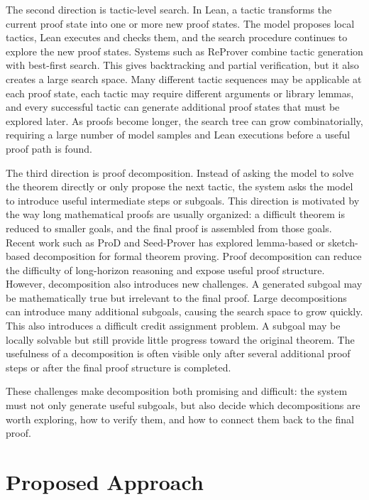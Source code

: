 The second direction is tactic-level search. In Lean, a tactic transforms the current proof state into one or more new proof states. The model proposes local tactics, Lean executes and checks them, and the search procedure continues to explore the new proof states. Systems such as ReProver \cite{yang2023leandojo} combine tactic generation with best-first search. This gives backtracking and partial verification, but it also creates a large search space. Many different tactic sequences may be applicable at each proof state, each tactic may require different arguments or library lemmas, and every successful tactic can generate additional proof states that must be explored later. As proofs become longer, the search tree can grow combinatorially, requiring a large number of model samples and Lean executions before a useful proof path is found.

The third direction is proof decomposition. Instead of asking the model to solve the theorem directly or only propose the next tactic, the system asks the model to introduce useful intermediate steps or subgoals. This direction is motivated by the way long mathematical proofs are usually organized: a difficult theorem is reduced to smaller goals, and the final proof is assembled from those goals. Recent work such as ProD \cite{ProD} and Seed-Prover \cite{seedProver} has explored lemma-based or sketch-based decomposition for formal theorem proving.
Proof decomposition can reduce the difficulty of long-horizon reasoning and expose useful proof structure. However, decomposition also introduces new challenges. A generated subgoal may be mathematically true but irrelevant to the final proof. Large decompositions can introduce many additional subgoals, causing the search space to grow quickly. This also introduces a difficult credit assignment problem. A subgoal may be locally solvable but still provide little progress toward the original theorem. The usefulness of a decomposition is often visible only after several additional proof steps or after the final proof structure is completed.

These challenges make decomposition both promising and difficult: the system must not only generate useful subgoals, but also decide which decompositions are worth exploring, how to verify them, and how to connect them back to the final proof.

\section{Proposed Approach}

